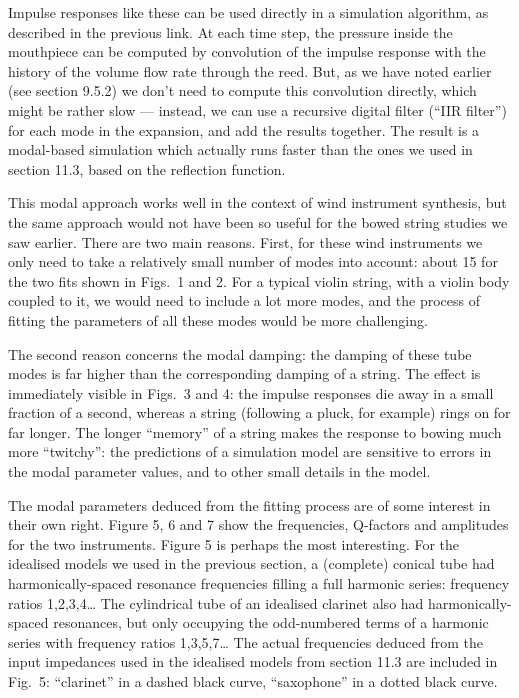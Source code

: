   Impulse responses like these can be used directly in a simulation algorithm, 
  as described in the previous link. At each time step, the pressure inside the 
  mouthpiece can be computed by convolution of the impulse response with the 
  history of the volume flow rate through the reed. But, as we have noted 
  earlier (see section 9.5.2) we don’t need to compute this convolution 
  directly, which might be rather slow — instead, we can use a recursive 
  digital filter (“IIR filter”) for each mode in the expansion, and add the 
  results together. The result is a modal-based simulation which actually runs 
  faster than the ones we used in section 11.3, based on the reflection 
  function. 

  This modal approach works well in the context of wind instrument synthesis, 
  but the same approach would not have been so useful for the bowed string 
  studies we saw earlier. There are two main reasons. First, for these wind 
  instruments we only need to take a relatively small number of modes into 
  account: about 15 for the two fits shown in Figs.\ 1 and 2. For a typical 
  violin string, with a violin body coupled to it, we would need to include a 
  lot more modes, and the process of fitting the parameters of all these modes 
  would be more challenging. 

  The second reason concerns the modal damping: the damping of these tube modes 
  is far higher than the corresponding damping of a string. The effect is 
  immediately visible in Figs.\ 3 and 4: the impulse responses die away in a 
  small fraction of a second, whereas a string (following a pluck, for example) 
  rings on for far longer. The longer “memory” of a string makes the response 
  to bowing much more “twitchy”: the predictions of a simulation model are 
  sensitive to errors in the modal parameter values, and to other small details 
  in the model. 

  The modal parameters deduced from the fitting process are of some interest in 
  their own right. Figure 5, 6 and 7 show the frequencies, Q-factors and 
  amplitudes for the two instruments. Figure 5 is perhaps the most interesting. 
  For the idealised models we used in the previous section, a (complete) 
  conical tube had harmonically-spaced resonance frequencies filling a full 
  harmonic series: frequency ratios 1,2,3,4… The cylindrical tube of an 
  idealised clarinet also had harmonically-spaced resonances, but only 
  occupying the odd-numbered terms of a harmonic series with frequency ratios 
  1,3,5,7… The actual frequencies deduced from the input impedances used in the 
  idealised models from section 11.3 are included in Fig.\ 5: ``clarinet'' in a 
  dashed black curve, ``saxophone'' in a dotted black curve. 

